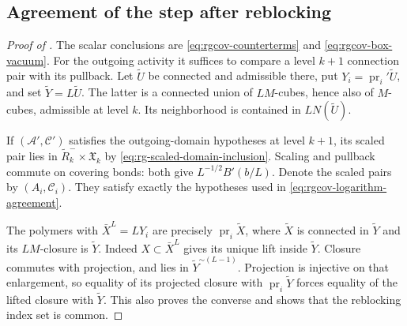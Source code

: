 \subsection{Agreement of the step after reblocking}
\label{subsec:rgcov-step-comparison}



\begin{proof}[Proof of ]
The scalar conclusions are
\eqref{eq:rgcov-counterterms} and
\eqref{eq:rgcov-box-vacuum}.
For the outgoing activity it suffices to compare a
level $k+1$ connection pair with its pullback.
Let $\widetilde U$ be connected and admissible there,
put $Y_i=\operatorname{pr}_i'\widetilde U$,
and set $\widetilde Y=L\widetilde U$.
The latter is a connected union of $LM$-cubes,
hence also of $M$-cubes, admissible at level $k$.
Its neighborhood is contained in $L N(\widetilde U)$.

If $(\mathscr A',\mathscr C')$ satisfies the outgoing-domain hypotheses at level
$k+1$, its scaled pair lies in
$\widetilde R_k^-\times\mathfrak X_k$ by
\eqref{eq:rg-scaled-domain-inclusion}.
Scaling and pullback commute on covering bonds:
both give $L^{-1/2}B'(b/L)$.
Denote the scaled pairs by $(A_i,\mathscr C_i)$.
They satisfy exactly the hypotheses used in
\eqref{eq:rgcov-logarithm-agreement}.

The polymers with $\bar X^L=LY_i$ are precisely
$\operatorname{pr}_i\widetilde X$, where
$\widetilde X$ is connected in $\widetilde Y$ and
its $LM$-closure is $\widetilde Y$.
Indeed $X\subset\bar X^L$ gives its unique lift
inside $\widetilde Y$. Closure commutes with projection,
and lies in $\widetilde Y^{\sim(L-1)}$.
Projection is injective on that enlargement,
so equality of its projected closure with
$\operatorname{pr}_i\widetilde Y$ forces equality
of the lifted closure with $\widetilde Y$.
This also proves the converse and shows that the
reblocking index set is common.


\end{proof}

